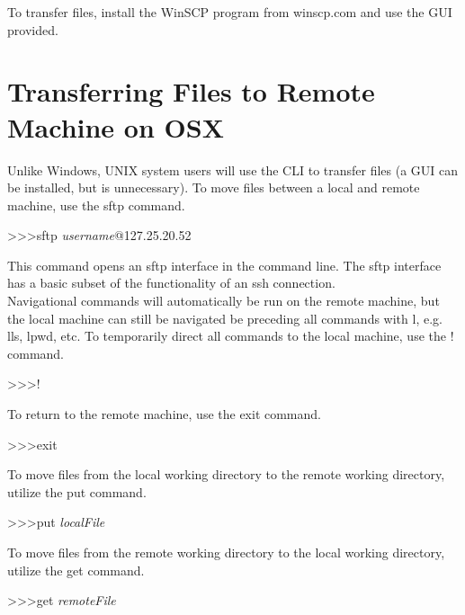 To transfer files, install the WinSCP program from winscp.com and use the GUI provided.

\section{Transferring Files to Remote Machine on OSX}
Unlike Windows, UNIX system users will use the CLI to transfer files (a GUI can be installed, but is unnecessary). To move files between a local and remote machine, use the sftp command.\\

\begin{mdframed}
\textgreater\textgreater\textgreater  \quad sftp \textit{username}@127.25.20.52
\end{mdframed}

This command opens an sftp interface in the command line. The sftp interface has a basic subset of the functionality of an ssh connection.\\

Navigational commands will automatically be run on the remote machine, but the local machine can still be navigated be preceding all commands with l, e.g. lls, lpwd, etc. To temporarily direct all commands to the local machine, use the ! command.\\

\begin{mdframed}
\textgreater\textgreater\textgreater \quad  !
\end{mdframed}

To return to the remote machine, use the exit command.\\

\begin{mdframed}
\textgreater\textgreater\textgreater \quad exit
\end{mdframed}

To move files from the local working directory to the remote working directory, utilize the put command.\\

\begin{mdframed}
\textgreater\textgreater\textgreater \quad put \textit{localFile}
\end{mdframed}

To move files from the remote working directory to the local working directory, utilize the get command.\\

\begin{mdframed}
\textgreater\textgreater\textgreater \quad get \textit{remoteFile}
\end{mdframed}

